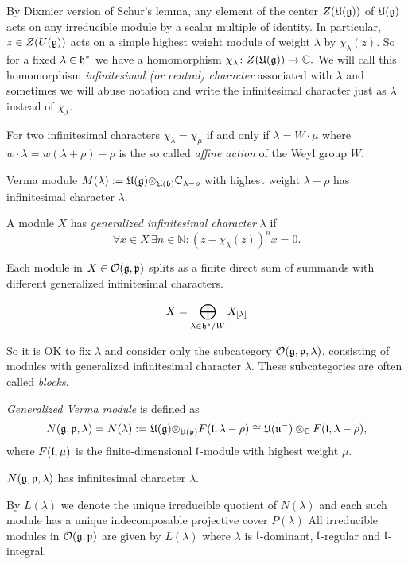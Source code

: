 \documentclass[a4paper,10pt]{article}
\begin{document}
By Dixmier version of Schur's lemma, any element of the center $Z(\mathfrak{U(g)})$ of $\mathfrak{U(g)}$ acts on any irreducible module by a scalar multiple of identity. In particular, $z \in Z(U(\mathfrak{g}))$ acts on a simple highest weight module of weight $\lambda$ by $\chi_\lambda(z)$. So for a fixed $\lambda \in \mathfrak{h}^*$ we have a homomorphism $\chi_\lambda \colon Z(\mathfrak{U(g)}) \to \mathbb{C}.$ We will call this homomorphism \emph{infinitesimal (or central) character} associated with $\lambda$ and sometimes we will abuse notation and write the infinitesimal character just as $\lambda$ instead of $\chi_\lambda.$ 

For two infinitesimal characters $\chi_\lambda = \chi_\mu$  if and only if $\lambda = W\cdot \mu$ where $w\cdot \lambda = w(\lambda + \rho) - \rho$ is the so called \emph{affine action} of the Weyl group $W$.

Verma module $M(\lambda):=\mathfrak{U(g) \otimes_{U(b)}} \mathbb{C}_{\lambda-\rho}$ with highest weight $\lambda - \rho$ has infinitesimal character $\lambda$.

A module $X$ has \emph{generalized infinitesimal character} $\lambda$ if 
\[
\forall x \in X\, \exists n \in \mathbb{N} \colon (z - \chi_\lambda(z))^n x = 0.
\]

Each module in $X \in \mathcal{O}(\mathfrak{g}, \mathfrak{p})$ splits as a finite direct sum of summands with different generalized infinitesimal characters.
 
 \[
X = \bigoplus_{\lambda \in \mathfrak{h}^\ast / W} X_{[\lambda]}
 \]

 So it is OK to fix $\lambda$ and consider only the subcategory $\mathcal{O}(\mathfrak{g}, \mathfrak{p}, \lambda)$, consisting of modules with generalized infinitesimal character $\lambda$. These subcategories are often called \emph{blocks}.

\begin{definition}
 \emph{Generalized Verma module} is defined as
 \[
 N(\mathfrak{g},\mathfrak{p},\lambda) = N(\lambda) := \mathfrak{U(g)\otimes_{U(p)}}   F(\mathfrak{l},\lambda - \rho) \cong \mathfrak{U(u^-)}\otimes_\mathbb{C}   F(\mathfrak{l},\lambda - \rho),
 \]
 where $F(\mathfrak{l},\mu)$ is the finite-dimensional $\mathfrak{l}$-module with highest weight $\mu$.
\end{definition}

\begin{example}
$N(\mathfrak{g},\mathfrak{p},\lambda)$ has infinitesimal character $\lambda.$
\end{example}

By $ L(\lambda)$ we denote the unique irreducible quotient of $N(\lambda)$ and each such module has a unique indecomposable projective cover $P(\lambda)$
All irreducible modules in $\mathcal{O}(\mathfrak{g},\mathfrak{p})$ are given by $L(\lambda)$ where $\lambda$ is $\mathfrak{l}$-dominant, $\mathfrak{l}$-regular and $\mathfrak{l}$-integral.
\end{document}
